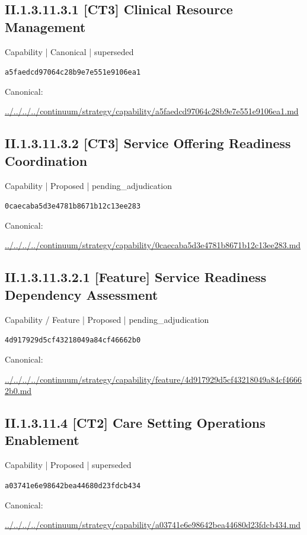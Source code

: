 \documentclass[10pt,a4paper]{article}
\begin{document}
\subsection*{II.1.3.11.3.1 [CT3] Clinical Resource Management}
{\small Capability | Canonical | superseded}\par
\texttt{a5faedcd97064c28b9e7e551e9106ea1}\par
Canonical: \par
{\footnotesize\url{../../../../continuum/strategy/capability/a5faedcd97064c28b9e7e551e9106ea1.md}}\par
\subsection*{II.1.3.11.3.2 [CT3] Service Offering Readiness Coordination}
{\small Capability | Proposed | pending\_adjudication}\par
\texttt{0caecaba5d3e4781b8671b12c13ee283}\par
Canonical: \par
{\footnotesize\url{../../../../continuum/strategy/capability/0caecaba5d3e4781b8671b12c13ee283.md}}\par
\subsection*{II.1.3.11.3.2.1 [Feature] Service Readiness Dependency Assessment}
{\small Capability / Feature | Proposed | pending\_adjudication}\par
\texttt{4d917929d5cf43218049a84cf46662b0}\par
Canonical: \par
{\footnotesize\url{../../../../continuum/strategy/capability/feature/4d917929d5cf43218049a84cf46662b0.md}}\par
\subsection*{II.1.3.11.4 [CT2] Care Setting Operations Enablement}
{\small Capability | Proposed | superseded}\par
\texttt{a03741e6e98642bea44680d23fdcb434}\par
Canonical: \par
{\footnotesize\url{../../../../continuum/strategy/capability/a03741e6e98642bea44680d23fdcb434.md}}\par
\end{document}
